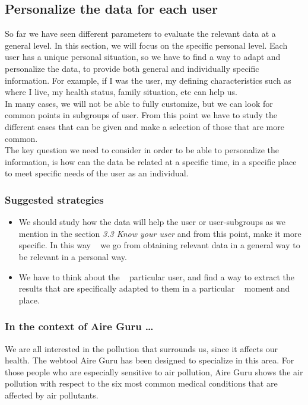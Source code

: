 \subsection{Personalize the data for each user}

So far we have seen different parameters to evaluate the relevant data at a general level. In this section, we will focus on the specific personal level.
Each user has a unique personal situation, so we have to find a way to adapt and personalize the data, to provide both general and individually specific information.
For example, if I was the user, my defining characteristics such as where I live,
my health status, family situation, etc can help us.\\

In many cases, we will not be able to fully customize, but we can look for common points in subgroups of
user. From this point we have to study the different cases that can be given and make a selection of those that are
more common.\\

The key question we need to consider in order to be able to personalize the information, is how can the data be related at a specific time, in a specific place to meet specific needs of the
user as an individual.

\subsubsection*{Suggested strategies} 

\begin{itemize}
  \item We should study how the data will help the user or user-subgroups as we mention in the section \textit{3.3 Know your user} and from this point, make it more specific. In this way
    we go from obtaining relevant data in a general way to be relevant in a personal way.
  \item We have to think about the
    particular user, and find a way to extract the results that are specifically adapted to them in a particular
    moment and place.
\end{itemize}

\subsubsection*{In the context of Aire Guru \ldots}

 We are all interested in the pollution that surrounds us, since it affects our health. The webtool
 Aire Guru has been designed to specialize in this area. For those people who are especially sensitive to air pollution, Aire Guru shows the air pollution with respect to the six most common medical conditions that
 are affected by air pollutants.
 
